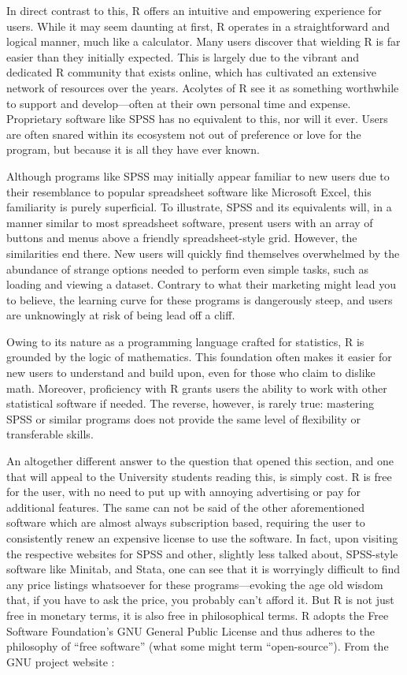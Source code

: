 In direct contrast to this, R offers an intuitive and empowering experience for users. While it may seem daunting at first, R operates in a straightforward and logical manner, much like a calculator. Many users discover that wielding R is far easier than they initially expected. This is largely due to the vibrant and dedicated R community that exists online, which has cultivated an extensive network of resources over the years. Acolytes of R see it as something worthwhile to support and develop—often at their own personal time and expense. Proprietary software like SPSS has no equivalent to this, nor will it ever. Users are often snared within its ecosystem not out of preference or love for the program, but because it is all they have ever known.

Although programs like SPSS may initially appear familiar to new users due to their resemblance to popular spreadsheet software like Microsoft Excel, this familiarity is purely superficial. To illustrate, SPSS and its equivalents will, in a manner similar to most spreadsheet software, present users with an array of buttons and menus above a friendly spreadsheet-style grid. However, the similarities end there. New users will quickly find themselves overwhelmed by the abundance of strange options needed to perform even simple tasks, such as loading and viewing a dataset. Contrary to what their marketing might lead you to believe, the learning curve for these programs is dangerously steep, and users are unknowingly at risk of being lead off a cliff.

Owing to its nature as a programming language crafted for statistics, R is grounded by the logic of mathematics. This foundation often makes it easier for new users to understand and build upon, even for those who claim to dislike math. Moreover, proficiency with R grants users the ability to work with other statistical software if needed. The reverse, however, is rarely true: mastering SPSS or similar programs does not provide the same level of flexibility or transferable skills.


An altogether different answer to the question that opened this section, and one that will appeal to the University students reading this, is simply cost. R is free for the user, with no need to put up with annoying advertising or pay for additional features. The same can not be said of the other aforementioned software which are almost always subscription based, requiring the user to consistently renew an expensive license to use the software. In fact, upon visiting the respective websites for SPSS and other, slightly less talked about, SPSS-style software like Minitab, and Stata, one can see that it is worryingly difficult to find any price listings whatsoever for these programs—evoking the age old wisdom that, if you have to ask the price, you probably can't afford it.  But R is not just free in monetary terms, it is also free in philosophical terms. R adopts the Free Software Foundation’s GNU General Public License and thus adheres to the philosophy of ``free software'' (what some might term ``open-source'').  From the GNU project website \parencite{GNUphil}:

